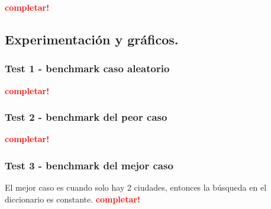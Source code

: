 \textcolor{red}{\textbf{completar!}}



\newpage
\subsection{Experimentación y gráficos.}

\vspace*{0.3cm}

\subsubsection{Test 1 - benchmark caso aleatorio}

\textcolor{red}{\textbf{completar!}}


\newpage
\subsubsection{Test 2 - benchmark del peor caso}



\textcolor{red}{\textbf{completar!}}


\newpage
\subsubsection{Test 3 - benchmark del mejor caso}

El mejor caso es cuando solo hay 2 ciudades, entonces la búsqueda en el
diccionario es constante.
\textcolor{red}{\textbf{completar!}}
